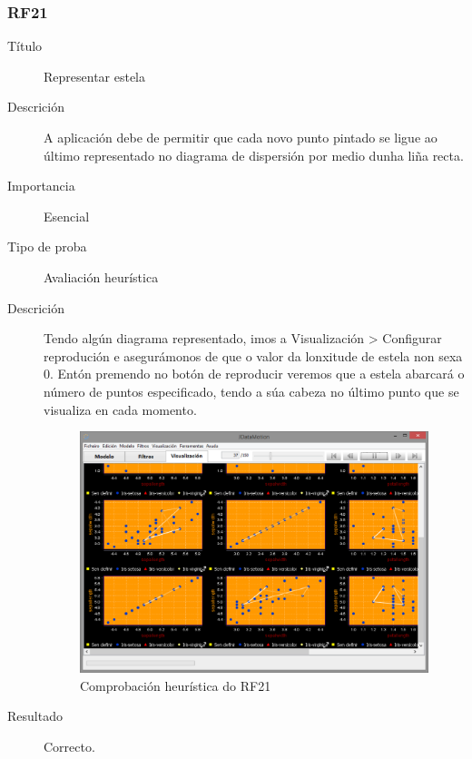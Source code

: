 \subsubsection*{RF21}
\begin{description}
\item[Título] \hfill
Representar estela
\item[Descrición] \hfill
A aplicación debe de permitir que cada novo punto pintado se ligue ao último representado no diagrama de dispersión por medio dunha liña recta.
\item[Importancia] \hfill
Esencial
\item[Tipo de proba] \hfill
Avaliación heurística
\item[Descrición]
Tendo algún diagrama representado, imos a Visualización \textgreater{} Configurar reprodución e asegurámonos de que o valor da lonxitude de estela non sexa 0. Entón premendo no botón de reproducir veremos que a estela abarcará o número de puntos especificado, tendo a súa cabeza no último punto que se visualiza en cada momento.
\begin{figure}
\centering
\includegraphics[width=\textwidth,height=\textheight,keepaspectratio]{figuras/RF202122}
\caption{Comprobación heurística do RF21}
\label{RF202122}
\end{figure}
\item[Resultado]
Correcto.
\end{description}

